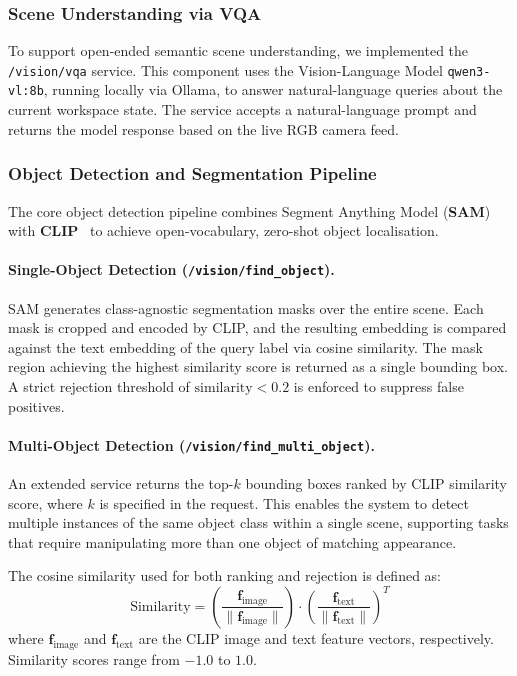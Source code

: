 \documentclass[12pt]{extarticle}
\begin{document}
\subsubsection{Scene Understanding via VQA}

To support open-ended semantic scene understanding, we implemented the \texttt{/vision/vqa} service. This component uses the Vision-Language Model \texttt{qwen3-vl:8b}, running locally via Ollama, to answer natural-language queries about the current workspace state. The service accepts a natural-language prompt and returns the model response based on the live RGB camera feed.

\subsubsection{Object Detection and Segmentation Pipeline}

The core object detection pipeline combines Segment Anything Model (\textbf{SAM})~\cite{kirillov2023segment} with \textbf{CLIP}~\cite{radford2021clip} to achieve open-vocabulary, zero-shot object localisation.

\paragraph{Single-Object Detection (\texttt{/vision/find\_object}).}
SAM generates class-agnostic segmentation masks over the entire scene. Each mask is cropped and encoded by CLIP, and the resulting embedding is compared against the text embedding of the query label via cosine similarity. The mask region achieving the highest similarity score is returned as a single bounding box. A strict rejection threshold of $\text{similarity} < 0.2$ is enforced to suppress false positives.

\paragraph{Multi-Object Detection (\texttt{/vision/find\_multi\_object}).}
An extended service returns the top-$k$ bounding boxes ranked by CLIP similarity score, where $k$ is specified in the request. This enables the system to detect multiple instances of the same object class within a single scene, supporting tasks that require manipulating more than one object of matching appearance.

The cosine similarity used for both ranking and rejection is defined as:
\begin{equation}
    \text{Similarity} = \left(\frac{\mathbf{f}_{\text{image}}}{\|\mathbf{f}_{\text{image}}\|}\right) \cdot \left(\frac{\mathbf{f}_{\text{text}}}{\|\mathbf{f}_{\text{text}}\|}\right)^T
    \label{eq:cosine}
\end{equation}
where $\mathbf{f}_{\text{image}}$ and $\mathbf{f}_{\text{text}}$ are the CLIP image and text feature vectors, respectively. Similarity scores range from $-1.0$ to $1.0$.
\end{document}
